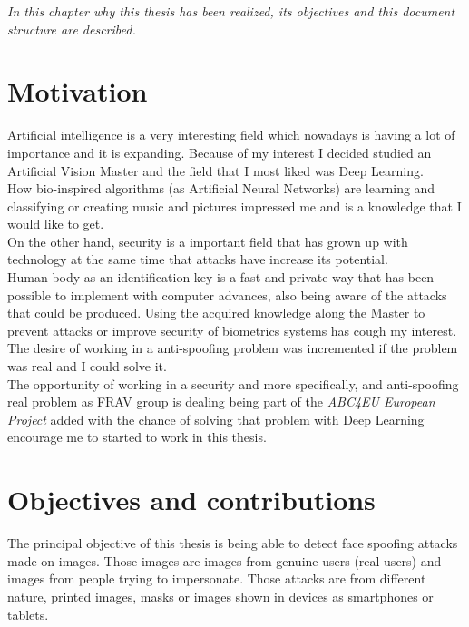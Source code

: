 \minitoc
\mtcskip

\begin{small}
\emph{In this chapter why this thesis has been realized, its objectives and this document structure are described.\\}
\end{small}
\section{Motivation}
Artificial intelligence is a very interesting field which nowadays is having a lot of importance and it is expanding. Because of my interest I decided studied an Artificial Vision Master and the field that I most liked was Deep Learning.\\

How bio-inspired algorithms (as Artificial Neural Networks) are learning and classifying or creating music and pictures impressed me and is a knowledge that I would like to get.\\

On the other hand, security is a important field that has grown up with technology at the same time that attacks have increase its potential.\\

Human body as an identification key is a fast and private way that has been possible to implement with computer advances, also being aware of the attacks that could be produced. Using the acquired knowledge along the Master to prevent attacks or improve security of biometrics systems has cough my interest.\\

The desire of working in a anti-spoofing problem was incremented if the problem was real and I could solve it.\\

The opportunity of working in a security and more specifically, and anti-spoofing real problem as FRAV group is dealing being part of the \textit{ABC4EU European Project} added with the chance of solving that problem with Deep Learning encourage me to started to work in this thesis.\\

\section{Objectives and contributions}
The principal objective of this thesis is being able to detect face spoofing attacks made on images. Those images are images from genuine users (real users) and images from people trying to impersonate. Those attacks are from different nature, printed images, masks or images shown in devices as smartphones or tablets.\\

